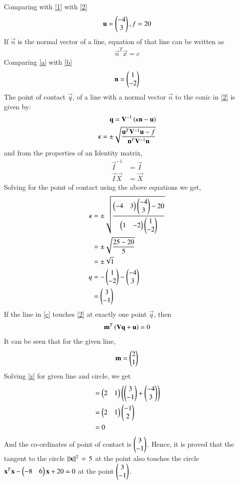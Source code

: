 \documentclass[journal,12pt,twocolumn]{IEEEtran}
\begin{document}
Comparing  with \eqref{1} with \eqref{2}
\begin{align}
\mathbf{u}=\begin{pmatrix}-4 \\ 3\end{pmatrix}, f=20
\end{align}
If $\vec{n}$ is the normal vector of a line, equation of that line can be written as 
\begin{align}
\vec{n}^T\vec{x} = c \label{b}
\end{align}
Comparing \eqref{a} with \eqref{b}
\begin{align}
\mathbf{n} = \begin{pmatrix}1 \\ -2\end{pmatrix}
\end{align}
 The point of contact $\vec{q}$, of a line with a normal vector $\vec{n}$ to the conic in \eqref{2} is given by:
\begin{align}
\mathbf{q} = \mathbf{V}^{-1}\left(\kappa \mathbf{n}-\mathbf{u}\right) 
\\
\kappa = \pm \sqrt{\frac{\mathbf{u}^T\mathbf{V}^{-1}\mathbf{u}-f}{\mathbf{n}^T\mathbf{V}^{-1}\mathbf{n}}} 
\end{align}
and from the properties of an Identity matrix, 
\begin{align}
\vec{I}^{-1} &= \vec{I} \\
\vec{I}\vec{X} &= \vec{X}   
\end{align}
Solving for the point of contact using the above equations we get,
\begin{align}
\kappa &= \pm \sqrt{\frac{\begin{pmatrix} -4 & 3 \end{pmatrix}\begin{pmatrix}-4 \\ 3\end{pmatrix} - 20}{\begin{pmatrix}1 & -2 \end{pmatrix}\begin{pmatrix}1 \\ -2 \end{pmatrix}}} \\
&= \pm \sqrt{\frac{25 - 20}{5}} \\
& =  \pm \sqrt{1} \\
q &= -\begin{pmatrix} 1\\-2 \end{pmatrix} - \begin{pmatrix}-4 \\ 3\end{pmatrix} \\
&= \begin{pmatrix}3 \\ -1\end{pmatrix}
\end{align}
If the line in \eqref{c} touches \eqref{2} at exactly one point $\vec{q}$, then 
\begin{align}
\mathbf{m}^T\left(\mathbf{V}\mathbf{q}+\mathbf{u}\right) = 0 \label{z}
\end{align}
It can be seen that for the given line,
\begin{align}
\mathbf{m} = \begin{pmatrix}2 \\ 1\end{pmatrix} 
\end{align}
Solving \eqref{z} for given line and circle, we get
\begin{align}
&= \begin{pmatrix}2 & 1\end{pmatrix}\left(\begin{pmatrix}3 \\ -1\end{pmatrix}+\begin{pmatrix}-4 \\ 3\end{pmatrix}\right) \\
&= \begin{pmatrix}2 & 1\end{pmatrix}\begin{pmatrix}-1 \\ 2\end{pmatrix}\\
&= 0
\end{align}
And the co-ordinates of point of contact is $\begin{pmatrix}3\\-1\end{pmatrix}$.
Hence, it is proved that the tangent to the circle $\lVert\mathbf{x}\rVert^2\,=\,5$ at the point  also touches the circle $  \mathbf{x}^T\mathbf{x}-\begin{pmatrix}-8 & 6\end{pmatrix}\mathbf{x}+20 = 0$ at the point $\begin{pmatrix}3\\-1\end{pmatrix}$.
\end{document}
